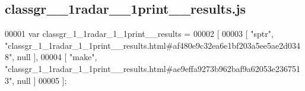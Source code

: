 \subsection{classgr\+\_\+\_\+1radar\+\_\+\_\+1print\+\_\+\+\_\+results.\+js}
\label{classgr__1__1radar__1__1print____results_8js_source}

\begin{DoxyCode}
00001 var classgr_1_1radar_1_1print__results =
00002 [
00003     [ \textcolor{stringliteral}{"sptr"}, \textcolor{stringliteral}{"classgr\_1\_1radar\_1\_1print\_\_results.html#af480e9c32ea6e1bf203a5ee5ae2d0348"}, null ],
00004     [ \textcolor{stringliteral}{"make"}, \textcolor{stringliteral}{"classgr\_1\_1radar\_1\_1print\_\_results.html#ae9effa9273b962baf9a62053e2367513"}, null ]
00005 ];
\end{DoxyCode}
